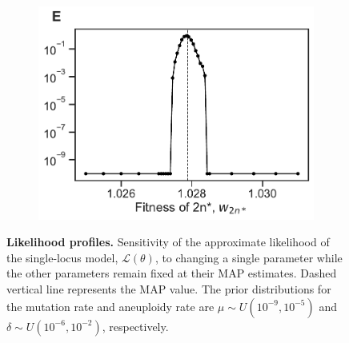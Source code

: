 \documentclass[12pt]{extarticle}
\newcommand{\likelihood}{\mathcal{L}}
\begin{document}
\begin{figure}[p]
\begin{subfigure}{0.3\textwidth}
      \includegraphics[width=\textwidth]{../figures/sensitivity-E.pdf}      
      \label{fig:sensitivity-eumt}
  \end{subfigure}
  \caption{
    \textbf{Likelihood profiles.} Sensitivity of the approximate likelihood of the single-locus model, $\likelihood(\theta)$, to changing a single parameter while the other parameters remain fixed at their MAP estimates. Dashed vertical line represents the MAP value. The prior distributions for the mutation rate and aneuploidy rate are $\mu \sim U(10^{-9}, 10^{-5})$ and $\delta \sim U(10^{-6}, 10^{-2})$, respectively. 
  }
  
  \label{fig:sensitivity}
\end{figure}
\end{document}
